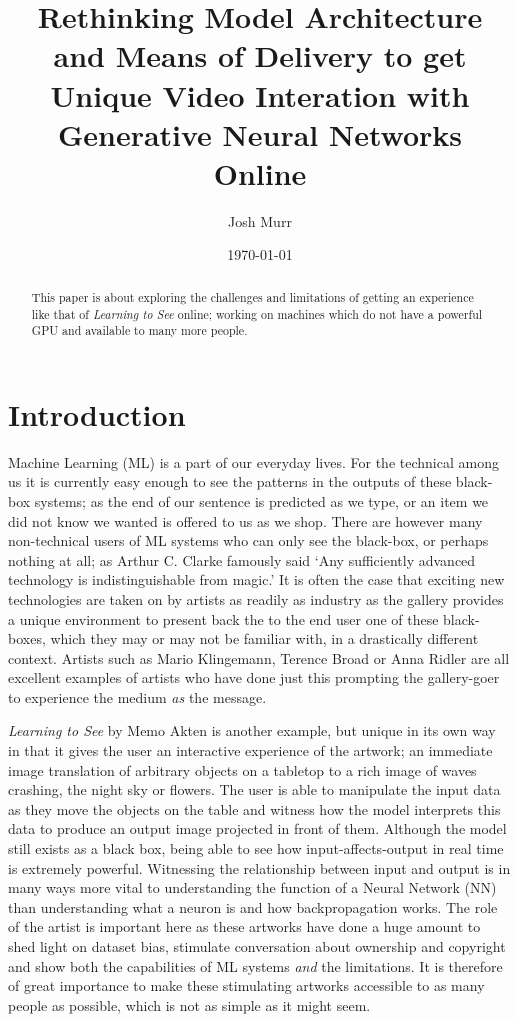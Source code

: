 \documentclass[a4paper]{article}
\title{Rethinking Model Architecture and Means of Delivery to get Unique Video Interation with Generative Neural Networks Online}
\date{\today}
\author{Josh Murr}
\begin{document}
\maketitle

\begin{abstract}
	This paper is about exploring the challenges and limitations of getting an experience like that of \textit{Learning to See} online; working on machines which do not have a powerful GPU and available to many more people.
\end{abstract}

\section{Introduction}
Machine Learning (ML) is a part of our everyday lives. For the technical among us it is currently easy enough to see the patterns in the outputs of these black-box systems; as the end of our sentence is predicted as we type, or an item we did not know we wanted is offered to us as we shop. There are however many non-technical users of ML systems who can only see the black-box, or perhaps nothing at all; as Arthur C. Clarke famously said `Any sufficiently advanced technology is indistinguishable from magic.' It is often the case that exciting new technologies are taken on by artists as readily as industry as the gallery provides a unique environment to present back the to the end user one of these black-boxes, which they may or may not be familiar with, in a drastically different context. Artists such as Mario Klingemann, Terence Broad or Anna Ridler are all excellent examples of artists who have done just this prompting the gallery-goer to experience the medium \textit{as} the message.

\textit{Learning to See} by Memo Akten is another example, but unique in its own way in that it gives the user an interactive experience of the artwork; an immediate image translation of arbitrary objects on a tabletop to a rich image of waves crashing, the night sky or flowers. The user is able to manipulate the input data as they move the objects on the table and witness how the model interprets this data to produce an output image projected in front of them. Although the model still exists as a black box, being able to see how input-affects-output in real time is extremely powerful. Witnessing the relationship between input and output is in many ways more vital to understanding the function of a Neural Network (NN) than understanding what a neuron is and how backpropagation works. The role of the artist is important here as these artworks have done a huge amount to shed light on dataset bias\cite{crawford_paglen_2019}, stimulate conversation about ownership and copyright\cite{romano_2016} and show both the capabilities of ML systems \textit{and} the limitations. It is therefore of great importance to make these stimulating artworks accessible to as many people as possible, which is not as simple as it might seem.
\end{document}
